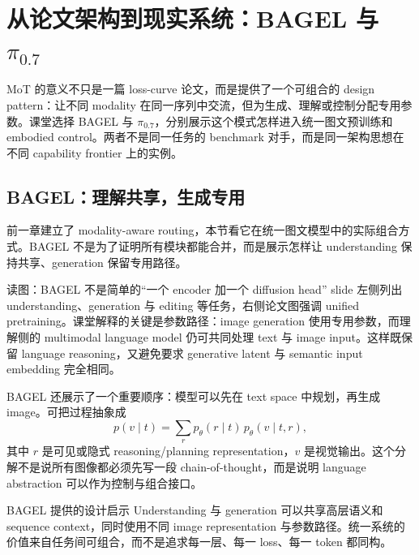 \section{从论文架构到现实系统：BAGEL 与 \texorpdfstring{$\pi_{0.7}$}{pi0.7}}

MoT 的意义不只是一篇 loss-curve 论文，而是提供了一个可组合的 design pattern：让不同 modality 在同一序列中交流，但为生成、理解或控制分配专用参数。课堂选择 BAGEL 与 $\pi_{0.7}$，分别展示这个模式怎样进入统一图文预训练和 embodied control。两者不是同一任务的 benchmark 对手，而是同一架构思想在不同 capability frontier 上的实例。

\subsection{BAGEL：理解共享，生成专用}

前一章建立了 modality-aware routing，本节看它在统一图文模型中的实际组合方式。BAGEL 不是为了证明所有模块都能合并，而是展示怎样让 understanding 保持共享、generation 保留专用路径。


\begin{knowledgebox}{读图：BAGEL 不是简单的“一个 encoder 加一个 diffusion head”}
slide 左侧列出 understanding、generation 与 editing 等任务，右侧论文图强调 unified pretraining。课堂解释的关键是参数路径：image generation 使用专用参数，而理解侧的 multimodal language model 仍可共同处理 text 与 image input。这样既保留 language reasoning，又避免要求 generative latent 与 semantic input embedding 完全相同。
\end{knowledgebox}

BAGEL 还展示了一个重要顺序：模型可以先在 text space 中规划，再生成 image。可把过程抽象成
$$
p(v\mid t)=\sum_r p_\theta(r\mid t)\,p_\theta(v\mid t,r),
$$
其中 $r$ 是可见或隐式 reasoning/planning representation，$v$ 是视觉输出。这个分解不是说所有图像都必须先写一段 chain-of-thought，而是说明 language abstraction 可以作为控制与组合接口。

\begin{importantbox}{BAGEL 提供的设计启示}
Understanding 与 generation 可以共享高层语义和 sequence context，同时使用不同 image representation 与参数路径。统一系统的价值来自任务间可组合，而不是追求每一层、每一 loss、每一 token 都同构。
\end{importantbox}


